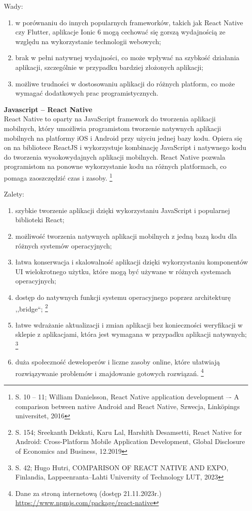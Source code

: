 \documentclass[12pt, a4paper, twoside, openany]{book}
\begin{document}
Wady:
\begin{enumerate}[label=--]
    \item w porównaniu do innych popularnych frameworków, takich jak React Native czy Flutter, aplikacje Ionic 6 mogą cechować się gorszą wydajnością ze względu na wykorzystanie technologii webowych;
    \item brak w pełni natywnej wydajności, co może wpływać na szybkość działania aplikacji, szczególnie w przypadku bardziej złożonych aplikacji;
    \item możliwe trudności w dostosowaniu aplikacji do różnych platform, co może wymagać dodatkowych prac programistycznych.
\end{enumerate}

\textbf{Javascript -- React Native\\}
\indent React Native to oparty na JavaScript framework do tworzenia aplikacji mobilnych, który umożliwia programistom tworzenie natywnych aplikacji mobilnych na platformy iOS i Android przy użyciu jednej bazy kodu.
Opiera się on na bibliotece ReactJS i wykorzystuje kombinację JavaScript i natywnego kodu do tworzenia wysokowydajnych aplikacji mobilnych.
React Native pozwala programistom na ponowne wykorzystanie kodu na różnych platformach, co pomaga zaoszczędzić czas i zasoby. \footnote{S. 10 -- 11; William Danielsson, React Native application development –- A comparison between native Android and React Native, Szwecja, Linköpings universitet, 2016}

Zalety:
\begin{enumerate}[label=--]
    \item szybkie tworzenie aplikacji dzięki wykorzystaniu JavaScript i popularnej biblioteki React;
    \item możliwość tworzenia natywnych aplikacji mobilnych z jedną bazą kodu dla różnych systemów operacyjnych;
    \item łatwa konserwacja i skalowalność aplikacji dzięki wykorzystaniu komponentów UI wielokrotnego użytku, które mogą być używane w różnych systemach operacyjnych;
    \item dostęp do natywnych funkcji systemu operacyjnego poprzez architekturę ,,bridge``; \footnote{S. 154; Sreekanth Dekkati, Karu Lal, Harshith Desamsetti, React Native for Android: Cross-Platform Mobile Application Development, Global Disclosure of Economics and Business, 12.2019}
    \item łatwe wdrażanie aktualizacji i zmian aplikacji bez konieczności weryfikacji w sklepie z aplikacjami, która jest wymagana w przypadku aplikacji natywnych; \footnote{S. 42; Hugo Hutri, COMPARISON OF REACT NATIVE AND EXPO, Finlandia, Lappeenranta–Lahti University of Technology LUT, 2023}
    \item duża społeczność deweloperów i liczne zasoby online, które ułatwiają rozwiązywanie problemów i znajdowanie gotowych rozwiązań. \footnote{Dane za stroną internetową (dostęp 21.11.2023r.) \url{https://www.npmjs.com/package/react-native}}
\end{enumerate}
\end{document}
